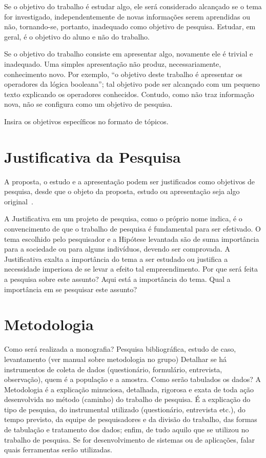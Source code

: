 \documentclass[
	12pt,				    %
	openright,			    %
	oneside,			    %
	a4paper,			    %
    sumario=tradicional,    %
	english,			    %
	brazil,				    %
	]{abntex2}
\begin{document}
Se o objetivo do trabalho é estudar algo, ele será considerado alcançado se o tema for investigado, independentemente de novas informações serem aprendidas ou não, tornando-se, portanto, inadequado como objetivo de pesquisa. Estudar, em geral, é o objetivo do aluno e não do trabalho.

Se o objetivo do trabalho consiste em apresentar algo, novamente ele é trivial e inadequado. Uma simples apresentação não produz, necessariamente, conhecimento novo. Por exemplo, “o objetivo deste trabalho é apresentar os operadores da lógica booleana”; tal objetivo pode ser alcançado com um pequeno texto explicando os operadores conhecidos. Contudo, como não traz informação nova, não se configura como um objetivo de pesquisa.

Insira os objetivos específicos no formato de tópicos.

\section{Justificativa da Pesquisa}\label{sec:Justificativa}

A proposta, o estudo e a apresentação podem ser justificados como objetivos de pesquisa, desde que o objeto da proposta, estudo ou apresentação seja algo original~\cite{wazlawick2009}.

A Justificativa em um projeto de pesquisa, como o próprio nome indica, é o convencimento de que o trabalho de pesquisa é fundamental para ser efetivado. O tema escolhido pelo pesquisador e a Hipótese levantada são de suma importância para a sociedade ou para alguns indivíduos, devendo ser comprovada.  A Justificativa exalta a importância do tema a ser estudado ou justifica a necessidade imperiosa de se levar a efeito tal empreendimento.
Por que será feita a pesquisa sobre este assunto? Aqui está a importância do tema. Qual a importância em se pesquisar este assunto?
 

\section{Metodologia}\label{sec:Metodologia}

Como será realizada a monografia? Pesquisa bibliográfica, estudo de caso, levantamento (ver manual sobre metodologia no grupo)
Detalhar se há instrumentos de coleta de dados (questionário, formulário, entrevista, observação), quem é a população e a amostra. Como serão tabulados os dados?  
A Metodologia é a explicação minuciosa, detalhada, rigorosa e exata de toda ação desenvolvida no método (caminho) do trabalho de pesquisa. 
É a explicação do tipo de pesquisa, do instrumental utilizado (questionário, entrevista etc.), do tempo previsto, da equipe de pesquisadores e da divisão do trabalho, das formas de tabulação e tratamento dos dados; enfim, de tudo aquilo que se utilizou no trabalho de pesquisa.
Se for desenvolvimento de sistemas ou de aplicações, falar quais ferramentas serão utilizadas.
\end{document}
